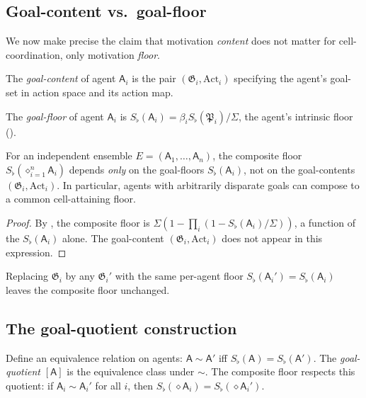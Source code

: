 \documentclass[11pt,twocolumn,a4paper]{article}
\newcommand{\Method}{\mathfrak{P}}
\newcommand{\Goal}{\mathfrak{G}}
\newcommand{\agent}{\mathsf{A}}
\newcommand{\Sfloor}{S_{\flat}}
\newcommand{\Action}{\mathrm{Act}}
\newcommand{\Compose}{\diamond}
\begin{document}
\subsection{Goal-content vs.\ goal-floor}

We now make precise the claim that motivation \emph{content} does not
matter for cell-coordination, only motivation \emph{floor}.

\begin{definition}\label{def:goal-content}
The \emph{goal-content} of agent $\agent_i$ is the pair
$(\Goal_i,\Action_i)$ specifying the agent's goal-set in action space
and its action map.
\end{definition}

\begin{definition}\label{def:goal-floor}
The \emph{goal-floor} of agent $\agent_i$ is
$\Sfloor(\agent_i)=\beta_i\Sfloor(\Method_i)/\Sigma$,
the agent's intrinsic floor ().
\end{definition}

\begin{theorem}\label{thm:mot-het}
For an independent ensemble $E=(\agent_1,\dots,\agent_n)$, the
composite floor $\Sfloor(\Compose_{i=1}^n\agent_i)$ depends \emph{only}
on the goal-floors $\Sfloor(\agent_i)$, not on the goal-contents
$(\Goal_i,\Action_i)$. In particular, agents with arbitrarily disparate
goals can compose to a common cell-attaining floor.
\end{theorem}

\begin{proof}
By , the composite floor is
$\Sigma(1-\prod_i(1-\Sfloor(\agent_i)/\Sigma))$, a function of the
$\Sfloor(\agent_i)$ alone. The goal-content $(\Goal_i,\Action_i)$
does not appear in this expression.
\end{proof}

\begin{corollary}\label{cor:goal-sub}
Replacing $\Goal_i$ by any $\Goal_i'$ with the same per-agent floor
$\Sfloor(\agent_i')=\Sfloor(\agent_i)$ leaves the composite floor
unchanged.
\end{corollary}

\subsection{The goal-quotient construction}

\begin{construction}\label{con:goal-quot}
Define an equivalence relation on agents: $\agent\sim\agent'$ iff
$\Sfloor(\agent)=\Sfloor(\agent')$. The \emph{goal-quotient}
$[\agent]$ is the equivalence class under $\sim$. The composite floor
respects this quotient: if $\agent_i\sim\agent_i'$ for all $i$, then
$\Sfloor(\Compose\agent_i)=\Sfloor(\Compose\agent_i')$.
\end{construction}
\end{document}
